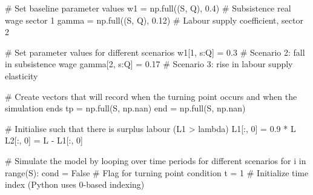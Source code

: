 \documentclass[
  letterpaper,
  DIV=11,
  numbers=noendperiod]{scrreprt}
\newenvironment{Shaded}{\begin{snugshade}}{\end{snugshade}}
\newcommand{\BuiltInTok}[1]{\textcolor[rgb]{0.00,0.23,0.31}{#1}}
\newcommand{\CommentTok}[1]{\textcolor[rgb]{0.37,0.37,0.37}{#1}}
\newcommand{\ControlFlowTok}[1]{\textcolor[rgb]{0.00,0.23,0.31}{#1}}
\newcommand{\DecValTok}[1]{\textcolor[rgb]{0.68,0.00,0.00}{#1}}
\newcommand{\FloatTok}[1]{\textcolor[rgb]{0.68,0.00,0.00}{#1}}
\newcommand{\KeywordTok}[1]{\textcolor[rgb]{0.00,0.23,0.31}{#1}}
\newcommand{\NormalTok}[1]{\textcolor[rgb]{0.00,0.23,0.31}{#1}}
\newcommand{\OperatorTok}[1]{\textcolor[rgb]{0.37,0.37,0.37}{#1}}
\newcommand{\VariableTok}[1]{\textcolor[rgb]{0.07,0.07,0.07}{#1}}
\begin{document}
\begin{tcolorbox}
\begin{Shaded}
\begin{Highlighting}[]
\CommentTok{\# Set baseline parameter values}
\NormalTok{w1 }\OperatorTok{=}\NormalTok{ np.full((S, Q), }\FloatTok{0.4}\NormalTok{)  }\CommentTok{\# Subsistence real wage sector 1}
\NormalTok{gamma }\OperatorTok{=}\NormalTok{ np.full((S, Q), }\FloatTok{0.12}\NormalTok{)  }\CommentTok{\# Labour supply coefficient, sector 2}

\CommentTok{\# Set parameter values for different scenarios}
\NormalTok{w1[}\DecValTok{1}\NormalTok{, s:Q] }\OperatorTok{=} \FloatTok{0.3}  \CommentTok{\# Scenario 2: fall in subsistence wage}
\NormalTok{gamma[}\DecValTok{2}\NormalTok{, s:Q] }\OperatorTok{=} \FloatTok{0.17}  \CommentTok{\# Scenario 3: rise in labour supply elasticity}

\CommentTok{\# Create vectors that will record when the turning point occurs and when the simulation ends}
\NormalTok{tp }\OperatorTok{=}\NormalTok{ np.full(S, np.nan)}
\NormalTok{end }\OperatorTok{=}\NormalTok{ np.full(S, np.nan)}

\CommentTok{\# Initialise such that there is surplus labour (L1 \textgreater{} lambda)}
\NormalTok{L1[:, }\DecValTok{0}\NormalTok{] }\OperatorTok{=} \FloatTok{0.9} \OperatorTok{*}\NormalTok{ L}
\NormalTok{L2[:, }\DecValTok{0}\NormalTok{] }\OperatorTok{=}\NormalTok{ L }\OperatorTok{{-}}\NormalTok{ L1[:, }\DecValTok{0}\NormalTok{]}

\CommentTok{\# Simulate the model by looping over time periods for different scenarios}
\ControlFlowTok{for}\NormalTok{ i }\KeywordTok{in} \BuiltInTok{range}\NormalTok{(S):}
\NormalTok{    cond }\OperatorTok{=} \VariableTok{False}  \CommentTok{\# Flag for turning point condition}
\NormalTok{    t }\OperatorTok{=} \DecValTok{1}  \CommentTok{\# Initialize time index (Python uses 0{-}based indexing)}


\end{Highlighting}
\end{Shaded}
\end{tcolorbox}
\end{document}
